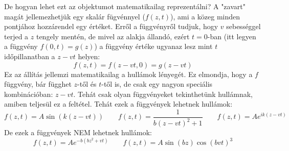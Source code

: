 \documentclass[a4paper,12pt]{article}
\begin{document}
De hogyan lehet ezt az objektumot matematikailag reprezentálni? A "zavart" magát jellemezhetjük egy skalár fügvénnyel ($f(z, t)$), ami a közeg minden pontjához hozzárendel egy értéket.
Erről a függvényről tudjuk, hogy $v$ sebességgel terjed a $z$ tengely mentén, de mivel az alakja állandó, ezért $t=0$-ban (itt legyen a függvény $f(0, t) = g(z)$) a függvény értéke ugyanaz lesz mint $t$ időpillanatban a $z - vt$ helyen:
\begin{equation}
    f(z, t) = f(z-vt, 0) = g(z - vt)
\end{equation}
Ez az állítás jellemzi matematikailag a hullámok lényegét.  Ez elmondja, hogy a $f$ függvény, bár függhet $z$-től és $t$-től is, de csak egy nagyon speciális kombinációban: $z - vt$.
Tehát csak olyan függvényeket tekinthetünk hullámnak, amiben teljesül ez a feltétel. Tehát ezek a függvények lehetnek hullámok:
\begin{equation}
    f(z, t) = A \sin(k(z - vt)) \qquad f(z, t) = \frac{1}{b(z-vt)^2 + 1} \qquad f(z, t) = A e^{i k (z - vt)}
\end{equation}
De ezek a függvények NEM lehetnek hullámok:
\begin{equation}
    f(z, t) = Ae^{-b(bz^2 + vt)} \qquad f(z, t) = A \sin(bz) \cos(bvt)^3
\end{equation}
\end{document}
